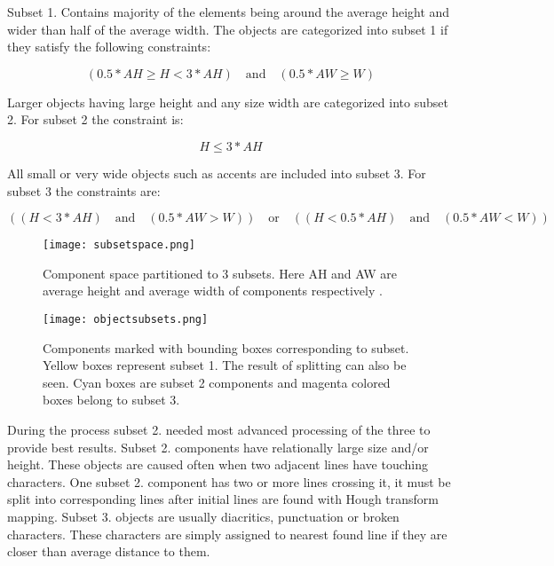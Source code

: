 \documentclass{article}
\begin{document}
            Subset 1. Contains majority of the elements being around the average height and wider than half of the average width. The objects are categorized into subset 1 if they satisfy the following constraints:

            \begin{equation}
              (0.5*AH \geq H < 3*AH) \quad \textrm{and} \quad (0.5*AW \geq W)
            \end{equation}

            Larger objects having large height and any size width are categorized into subset 2. For subset 2 the constraint is:

            \begin{equation}
              H \leq 3*AH
            \end{equation}

            All small or very wide objects such as accents are included into subset 3. For subset 3 the constraints are:

            \begin{equation}
              ((H < 3*AH)\quad \textrm{and} \quad (0.5*AW > W)) \quad \textrm{or} \quad((H < 0.5*AH)\quad \textrm{and} \quad(0.5*AW < W))
            \end{equation}


            \begin{figure}[!ht]
              \centering
              \texttt{[image: subsetspace.png]}
              \caption{Component space partitioned to 3 subsets. Here AH and AW are average height and average width of components respectively \cite{Louloudis1}. \label{fig:subsetspace}}
            \end{figure}

            \begin{figure}[!ht]
              \centering
              \texttt{[image: objectsubsets.png]}
              \caption{Components marked with bounding boxes corresponding to subset. Yellow boxes represent subset 1. The result of splitting can also be seen. Cyan boxes are subset 2 components and magenta colored boxes belong to subset 3.  \label{fig:subsetboxes} }
            \end{figure}

            During the process subset 2. needed most advanced processing of the three to provide best results. Subset 2. components have relationally large size and/or height. These objects are caused often when two adjacent lines have touching characters. One subset 2. component has two or more lines crossing it, it must be split into corresponding lines after initial lines are found with Hough transform mapping. Subset 3. objects are usually diacritics, punctuation or broken characters. These characters are simply assigned to nearest found line if they are closer than average distance to them.
\end{document}
